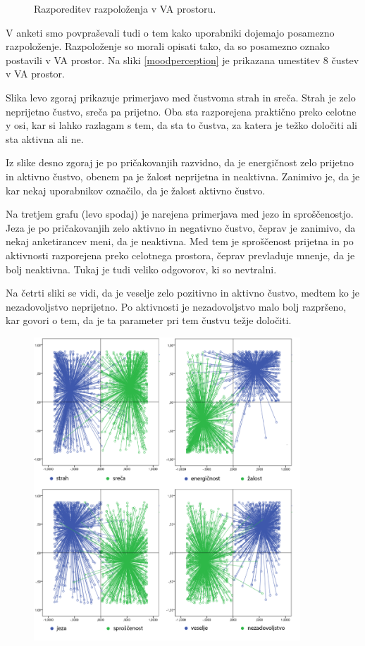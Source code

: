 \documentclass[a4paper, 12pt]{book}
\begin{document}
{\begin{figure}[hbt]
\caption{Razporeditev razpoloženja v VA prostoru.  }
\label{razpolozenjeva}
\end{figure}

V anketi smo povpraševali tudi o tem kako uporabniki dojemajo posamezno razpoloženje. Razpoloženje so morali opisati tako, da so posamezno oznako postavili v VA prostor. Na sliki \ref{moodperception} je prikazana umestitev 8 čustev v VA prostor. 

Slika levo zgoraj prikazuje primerjavo med čustvoma strah in sreča. Strah je zelo neprijetno čustvo, sreča pa prijetno. Oba sta razporejena praktično preko celotne y osi, kar si lahko razlagam s tem, da sta to čustva, za katera je težko določiti ali sta aktivna ali ne. 

Iz slike desno zgoraj je po pričakovanjih razvidno, da je energičnost zelo prijetno in aktivno čustvo, obenem pa je žalost neprijetna in neaktivna. Zanimivo je, da je kar nekaj uporabnikov označilo, da je žalost aktivno čustvo.

Na tretjem grafu (levo spodaj) je narejena primerjava med jezo in sproščenostjo. Jeza je po pričakovanjih zelo aktivno in negativno čustvo, čeprav je zanimivo, da nekaj anketirancev meni, da je neaktivna. Med tem je sproščenost prijetna in po aktivnosti razporejena preko celotnega prostora, čeprav prevladuje mnenje, da je bolj neaktivna. Tukaj je tudi veliko odgovorov, ki so nevtralni.

Na četrti sliki se vidi, da je veselje zelo pozitivno in aktivno čustvo, medtem ko je nezadovoljstvo neprijetno. Po aktivnosti je nezadovoljstvo malo bolj razpršeno, kar govori o tem, da je ta parameter pri tem čustvu težje določiti.

\begin{figure}[hbt]
\centering
\includegraphics[width=10cm]{images/vamoodlables.png}


\end{figure}}
\end{document}
